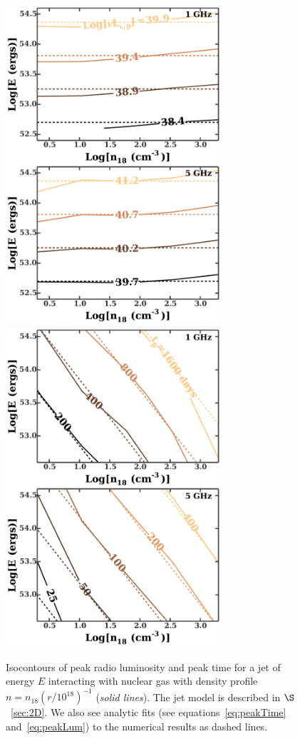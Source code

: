 \documentclass[usenatbib,fleqn]{mnras}
\begin{document}
\begin{figure}
  \includegraphics[width=8cm]{lp_contours.pdf}
  \includegraphics[width=8cm]{tp_contours.pdf}
  \caption{\label{fig:jetContours} Isocontours of peak radio
    luminosity and peak time for a jet of energy $E$ interacting with
    nuclear gas with density profile $n=n_{18}
    \left(r/10^{18}\right)^{-1}$ (\textit{solid lines}). The jet model
    is described in $\S$~\ref{sec:2D}. We also see analytic fits (see
    equations~\ref{eq:peakTime} and~\ref{eq:peakLum}) to the numerical
    results as dashed lines.}
\end{figure}
\end{document}
